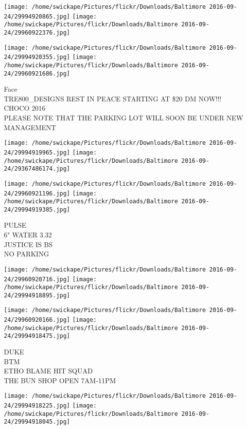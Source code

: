 \documentclass[10pt,letterpaper]{article}
\begin{document}
\texttt{[image: /home/swickape/Pictures/flickr/Downloads/Baltimore 2016-09-24/29994920865.jpg]}
\texttt{[image: /home/swickape/Pictures/flickr/Downloads/Baltimore 2016-09-24/29960922376.jpg]}

\texttt{[image: /home/swickape/Pictures/flickr/Downloads/Baltimore 2016-09-24/29994920355.jpg]}
\texttt{[image: /home/swickape/Pictures/flickr/Downloads/Baltimore 2016-09-24/29960921686.jpg]}

Face\\
TRE800\_DESIGNS REST IN PEACE STARTING AT \$20 DM NOW!!!\\
CHOCO 2016\\
PLEASE NOTE THAT THE PARKING LOT WILL SOON BE UNDER NEW MANAGEMENT
\pagebreak

\texttt{[image: /home/swickape/Pictures/flickr/Downloads/Baltimore 2016-09-24/29994919965.jpg]}
\texttt{[image: /home/swickape/Pictures/flickr/Downloads/Baltimore 2016-09-24/29367486174.jpg]}

\texttt{[image: /home/swickape/Pictures/flickr/Downloads/Baltimore 2016-09-24/29960921196.jpg]}
\texttt{[image: /home/swickape/Pictures/flickr/Downloads/Baltimore 2016-09-24/29994919385.jpg]}

PULSE\\
6" WATER 3.32\\
JUSTICE IS BS\\
NO PARKING
\pagebreak

\texttt{[image: /home/swickape/Pictures/flickr/Downloads/Baltimore 2016-09-24/29960920716.jpg]}
\texttt{[image: /home/swickape/Pictures/flickr/Downloads/Baltimore 2016-09-24/29994918895.jpg]}

\texttt{[image: /home/swickape/Pictures/flickr/Downloads/Baltimore 2016-09-24/29960920166.jpg]}
\texttt{[image: /home/swickape/Pictures/flickr/Downloads/Baltimore 2016-09-24/29994918475.jpg]}

DUKE\\
BTM\\
ETHO BLAME HIT SQUAD\\
THE BUN SHOP OPEN 7AM{-}11PM
\pagebreak

\texttt{[image: /home/swickape/Pictures/flickr/Downloads/Baltimore 2016-09-24/29994918225.jpg]}
\texttt{[image: /home/swickape/Pictures/flickr/Downloads/Baltimore 2016-09-24/29994918045.jpg]}
\end{document}
